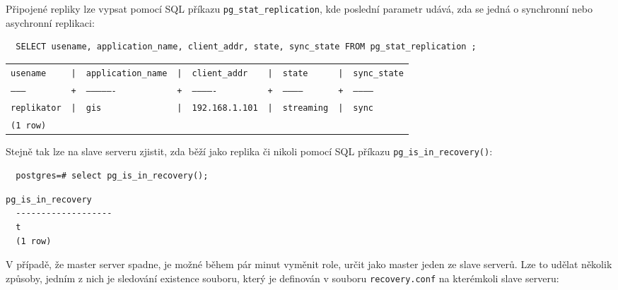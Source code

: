 Připojené repliky lze vypsat pomocí SQL příkazu \texttt{pg\_stat\_replication}, kde poslední parametr udává, zda se jedná o synchronní nebo asychronní replikaci:

\begin{lstlisting}
  SELECT usename, application_name, client_addr, state, sync_state FROM pg_stat_replication ;
\end{lstlisting}

      \begin{table}[H]
        \label{pgHba}
          \begin{center}
            \begin{tabular}{lllllllll}
              \texttt{usename} & \texttt{|} & \texttt{application\_name}  &\texttt{|}  &\texttt{client\_addr}  &\texttt{|}    &\texttt{state}    &\texttt{|}  &\texttt{sync\_state} \\
           \texttt{---------}  &\texttt{+}  &\texttt{----------------}  &\texttt{+}  &\texttt{-------------}  &\texttt{+}  &\texttt{-----------}  &\texttt{+}  &\texttt{------------}\\
          \texttt{replikator}  &\texttt{|}  &\texttt{gis}               &\texttt{|}  &\texttt{192.168.1.101}  &\texttt{|}  &\texttt{streaming}  &\texttt{|}  &\texttt{sync}\\
              \texttt{(1 row)} & & & & & & & & \\

            \end{tabular}
          \end{center}
      \end{table}

Stejně tak lze na slave serveru zjistit, zda běží jako replika či nikoli pomocí SQL příkazu \texttt{pg\_is\_in\_recovery()}:

\begin{lstlisting}
  postgres=# select pg_is_in_recovery();
\end{lstlisting}
\begin{lstlisting}[basicstyle=\footnotesize\ttfamily,keywordstyle=\color{black},identifierstyle=\color{black},stringstyle=\color{black}]
  pg_is_in_recovery 
  -------------------
  t
  (1 row)
\end{lstlisting}

V případě, že master server spadne, je možné během pár minut vyměnit role, určit jako master jeden ze slave serverů. Lze to udělat několik způsoby, jedním z nich je sledování existence souboru, který je definován v souboru \texttt{recovery.conf} na kterémkoli slave serveru:

